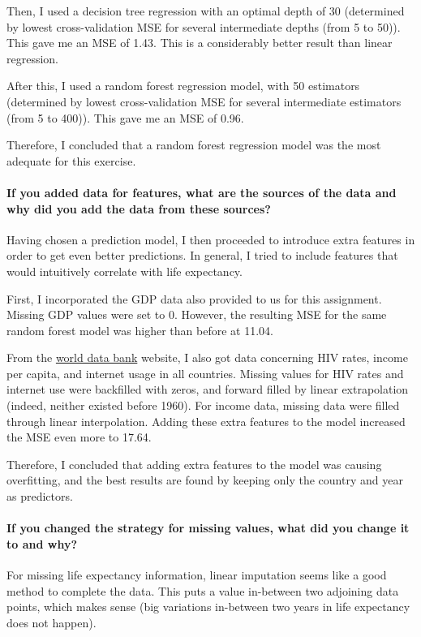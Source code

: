 \documentclass[]{article}
\let\oldparagraph\paragraph
\renewcommand{\paragraph}[1]{\oldparagraph{#1}\mbox{}}
\begin{document}
Then, I used a decision tree regression with an optimal depth of 30 (determined by lowest cross-validation MSE for several intermediate depths (from 5 to 50)). This gave me an MSE of 1.43. This is a considerably better result than linear regression.

After this, I used a random forest regression model, with 50 estimators (determined by lowest cross-validation MSE for several intermediate estimators (from 5 to 400)). This gave me an MSE of 0.96.

Therefore, I concluded that a random forest regression model was the most adequate for this exercise.

\paragraph{If you added data for features, what are the sources of the data and why did you add the data from these sources?}

Having chosen a prediction model, I then proceeded to introduce extra features in order to get even better predictions. In general, I tried to include features that would intuitively correlate with life expectancy.

First, I incorporated the GDP data also provided to us for this assignment. Missing GDP values were set to 0. However, the resulting MSE for the same random forest model was higher than before at 11.04.

From the \href{http://data.worldbank.org/}{world data bank} website, I also got data concerning HIV rates, income per capita, and internet usage in all countries. Missing values for HIV rates and internet use were backfilled with zeros, and forward filled by linear extrapolation (indeed, neither existed before 1960). For income data, missing data were filled through linear interpolation. Adding these extra features to the model increased the MSE even more to 17.64.

Therefore, I concluded that adding extra features to the model was causing overfitting, and the best results are found by keeping only the country and year as predictors.

\paragraph{If you changed the strategy for missing values, what did you change it to and why?}

For missing life expectancy information, linear imputation seems like a good method to complete the data. This puts a value in-between two adjoining data points, which makes sense (big variations in-between two years in life expectancy does not happen).
\end{document}
